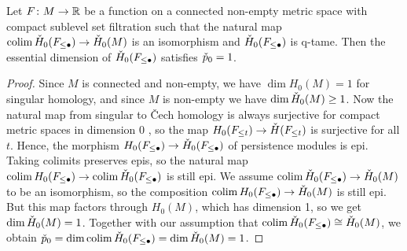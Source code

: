 \begin{lem}
\label{lem:essential_cech_dim}
	Let $F \colon M \to \mathbb{R}$ be a function on a connected non-empty metric space with compact sublevel set filtration such that the natural map $\operatorname*{colim} \check{H}_0(F_{\leq \bullet}) \to \check{H}_0(M)$ is an isomorphism and $\check{H}_0(F_{\leq \bullet})$ is q-tame.
	Then the essential dimension of $\check{H}_0(F_{\leq \bullet})$ satisfies $\check{p}_{0} = 1$.
\end{lem}
\begin{proof}
	Since $M$ is connected and non-empty, we have $\dim H_{0}(M) = 1$ for singular homology, and since $M$ is non-empty we have $\dim \check{H}_0(M) \geq 1$.
	Now the natural map from singular to \v{C}ech homology is always surjective for compact metric spaces in dimension 0 \cite{Eda.2000}, so the map $H_{0}(F_{\leq t}) \to \check{H}(F_{\leq t})$ is surjective for all $t$.
	Hence, the morphism $H_{0}(F_{\leq \bullet}) \to \check{H}_{0}(F_{\leq \bullet})$ of persistence modules is epi.
	Taking colimits preserves epis, so the natural map $\operatorname*{colim} H_{0}(F_{\leq \bullet}) \to \operatorname*{colim} \check{H}_{0}(F_{\leq \bullet})$ is still epi. 
	We assume $\operatorname*{colim} \check{H}_0(F_{\leq \bullet}) \to \check{H}_0(M)$ to be an isomorphism, so the composition $\operatorname*{colim} H_0(F_{\leq \bullet}) \to \check{H}_0(M)$ is still epi.
	But this map factors through $H_{0}(M)$, which has dimension 1, so we get $\dim \check{H}_0(M) = 1$.
	Together with our assumption that $\operatorname*{colim} \check{H}_{0}(F_{\leq \bullet}) \cong \check{H}_{0}(M)$, we obtain $\check{p}_0 = \dim \operatorname*{colim} \check{H}_0(F_{\leq \bullet}) = \dim \check{H}_0(M) = 1$.
\end{proof}

